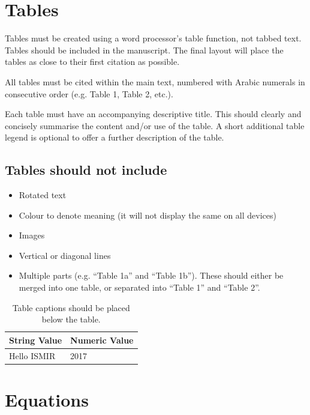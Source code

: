 \documentclass{article}
\begin{document}
\section{Tables}\label{sec:tables}

Tables must be created using a word processor's table function,
not tabbed text.
Tables should be included in the manuscript.
The final layout will place the tables as close to their first
citation as possible.

All tables must be cited within the main text, numbered with Arabic
numerals in consecutive order (e.g. Table 1, Table 2, etc.).

Each table must have an accompanying descriptive title.
This should clearly and concisely summarise the content and/or
use of the table.
A short additional table legend is optional to offer a further
description of the table.

\subsection{Tables should not include}

\begin{itemize}
  \item Rotated text
  \item Colour to denote meaning (it will not display the same on all devices)
  \item Images
  \item Vertical or diagonal lines
  \item Multiple parts (e.g. ``Table 1a'' and ``Table 1b'').
  These should either be merged into one table,
  or separated into ``Table 1'' and ``Table 2''.
\end{itemize}

\begin{table}[htpb]
\centering
  \begin{tabular}{ll}
  \toprule
  \bfseries String Value & \bfseries Numeric Value \\ \midrule
  Hello ISMIR  & 2017          \\
  \bottomrule
  \end{tabular}
  \caption{Table captions should be placed below the table.}
\label{tab:table}
\end{table}

\section{Equations}\label{sec:equations}
\end{document}

